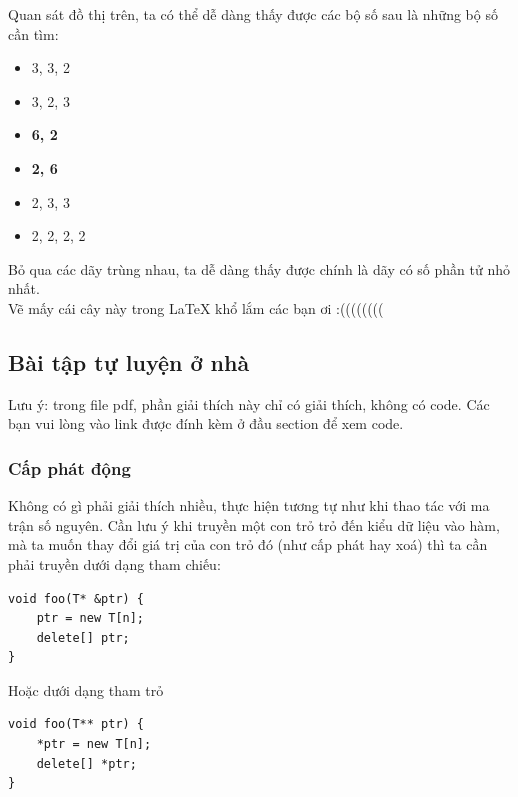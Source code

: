 \documentclass[main.tex]{subfiles}
\begin{document}
Quan sát đồ thị trên, ta có thể dễ dàng thấy được các bộ số sau là những bộ số cần tìm:
\begin{center}
\end{center}

\begin{itemize}
    \item 3, 3, 2
    \item 3, 2, 3
    \item \textbf{6, 2}
    \item \textbf{2, 6}
    \item 2, 3, 3
    \item 2, 2, 2, 2
\end{itemize}
Bỏ qua các dãy trùng nhau, ta dễ dàng thấy được  chính là dãy có số phần tử nhỏ nhất.\\
{\scriptsize Vẽ mấy cái cây này trong LaTeX khổ lắm các bạn ơi :((((((((}


\subsection{Bài tập tự luyện ở nhà}
Lưu ý: trong file pdf, phần giải thích này chỉ có giải thích, không có code. Các bạn vui lòng vào link được đính kèm ở đầu section để xem code.
\subsubsection{Cấp phát động}
Không có gì phải giải thích nhiều, thực hiện tương tự như khi thao tác với ma trận số nguyên.
Cần lưu ý khi truyền một con trỏ trỏ đến kiểu dữ liệu  vào hàm, mà ta muốn thay đổi giá trị của con trỏ đó (như cấp phát hay xoá) thì ta cần phải truyền dưới dạng tham chiếu: 
\begin{verbatim}
void foo(T* &ptr) {
    ptr = new T[n];
    delete[] ptr;
}
\end{verbatim}
Hoặc dưới dạng tham trỏ
\begin{verbatim}
void foo(T** ptr) {
    *ptr = new T[n];
    delete[] *ptr;
}
\end{verbatim}
\end{document}

